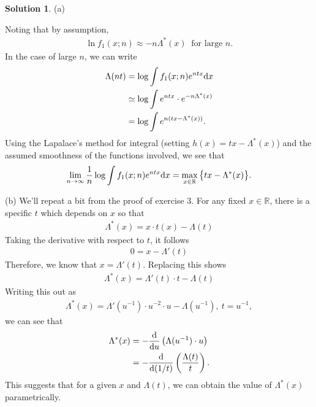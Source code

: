 \documentclass[12pt]{article}
\newcommand{\bbR}{\mathbb{R}}
\def\rd{{\rm d}}
\theoremstyle{definition}
\newtheorem{sol}{Solution}
\theoremstyle{remark}
\begin{document}
\begin{sol}
    (a)       

    Noting that by assumption, 
    \begin{align*}
        \ln f_1(x;n) \approx -n\Lambda^*(x) \ \text{ for large } n.
    \end{align*}
     In the case of large $n$, we can write
     \begin{align*}
        \Lambda(nt) &= \log \int f_{1}(x;n) e^{ntx} \rd x \\
                    &\simeq \log \int e^{ntx} \cdot e^{- n\Lambda^{*}(x)}\\
                    &= \log \int e^{n(tx - \Lambda^{*}(x))} .
    \end{align*}
    Using the Lapalace's method for integral (setting $h(x) = tx - \Lambda^{*}(x)$) and the assumed smoothness of the functions involved, we see that
    \begin{align*}
       \lim_{n\to\infty} \frac{1}{n} \log\int
                    f_1(x;n)e^{ntx}\rd x =
      \max_{x\in\mathbb{R}}
              \big\{ tx - \Lambda^*(x) \big\}.
    \end{align*}

    (b) We'll repeat a bit from the proof of exercise 3. For any fixed $x\in\bbR$, there is a specific $t$ which depends on $x$ so that
    \begin{align*}
        \Lambda^{*}(x) = x \cdot t(x) - \Lambda(t)
    \end{align*}
    Taking the derivative with respect to $t$, it follows
    \begin{align*}
        0 = x - \Lambda'(t)
    \end{align*}
    Therefore, we know that $x = \Lambda'(t)$. Replacing this shows
    \begin{align*}
        \Lambda^{*}(x) = \Lambda'(t) \cdot t - \Lambda(t)
    \end{align*}
    Writing this out as 
    \begin{align*}
            \Lambda^{*}(x) = \Lambda'(u^{-1}) \cdot u^{-2} \cdot u - \Lambda(u^{-1}), \ t = u^{-1},
    \end{align*}
    we can see that 
    \begin{align*}
        \Lambda^{*}(x) &=  -\frac{\rd}{\rd u} \left( \Lambda(u^{-1})\cdot u \right)\\
                       &=  -\frac{\rd}{\rd ( 1 / t )} \left( \frac{\Lambda(t)}{t} \right).
    \end{align*}
    This suggests that for a given $x$ and $\Lambda(t)$, we can obtain the value of $\Lambda^{*}(x)$ parametrically.
\end{sol}
\end{document}
